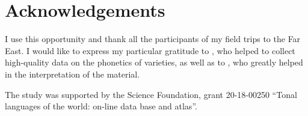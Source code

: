 \documentclass[output=paper,colorlinks,citecolor=brown]{langscibook}
\begin{document}
\section*{Acknowledgements}

I use this opportunity and thank all the participants of my field trips to the  Far East. I would like to express my particular gratitude to , who helped to collect high-quality data on the phonetics of  varieties, as well as to , who greatly helped in the interpretation of the material.

The study was supported by the  Science Foundation, grant 20-18-00250 “Tonal languages of the world: on-line data base and atlas”.

{\sloppy\printbibliography[heading=subbibliography,notkeyword=this]}
\end{document}
